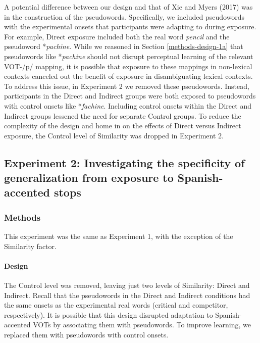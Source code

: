 \documentclass[
  12pt,
  twoside]{article}
\begin{document}
A potential difference between our design and that of Xie and Myers (2017) was in the construction of the pseudowords.
Specifically, we included pseudowords with the experimental onsets that participants were adapting to during exposure.
For example, Direct exposure included both the real word \emph{pencil} and the pseudoword *\emph{pachine}.
While we reasoned in Section \ref{methods-design-1a} that pseudowords like *\emph{pachine} should not disrupt perceptual learning of the relevant VOT-/p/ mapping, it is possible that exposure to these mappings in non-lexical contexts canceled out the benefit of exposure in disambiguating lexical contexts.
To address this issue, in Experiment 2 we removed these pseudowords.
Instead, participants in the Direct and Indirect groups were both exposed to pseudowords with control onsets like *\emph{fachine}.
Including control onsets within the Direct and Indirect groups lessened the need for separate Control groups.
To reduce the complexity of the design and home in on the effects of Direct versus Indirect exposure, the Control level of Similarity was dropped in Experiment 2.

\hypertarget{experiment-2-investigating-the-specificity-of-generalization-from-exposure-to-spanish-accented-stops}{%
\subsection{Experiment 2: Investigating the specificity of generalization from exposure to Spanish-accented stops}\label{experiment-2-investigating-the-specificity-of-generalization-from-exposure-to-spanish-accented-stops}}

\hypertarget{methods-1}{%
\subsubsection{Methods}\label{methods-1}}

This experiment was the same as Experiment 1, with the exception of the Similarity factor.

\hypertarget{design}{%
\paragraph{Design}\label{design}}

The Control level was removed, leaving just two levels of Similarity: Direct and Indirect.
Recall that the pseudowords in the Direct and Indirect conditions had the same onsets as the experimental real words (critical and competitor, respectively).
It is possible that this design disrupted adaptation to Spanish-accented VOTs by associating them with pseudowords.
To improve learning, we replaced them with pseudowords with control onsets.
\end{document}

